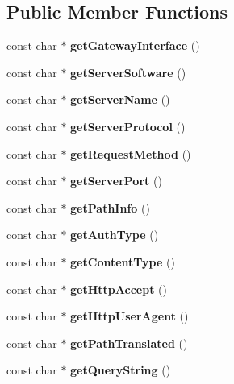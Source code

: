 \subsection*{Public Member Functions}
\begin{CompactItemize}
\item 
const char $\ast$ \textbf{getGatewayInterface} ()\label{classRawRequest_611f7e574e9327a4b28e8eaa2b0768da}

\item 
const char $\ast$ \textbf{getServerSoftware} ()\label{classRawRequest_0fe73e3bf7f06c826f1ce0559acab613}

\item 
const char $\ast$ \textbf{getServerName} ()\label{classRawRequest_e52072dc0f3b002d789307baf7d5b5de}

\item 
const char $\ast$ \textbf{getServerProtocol} ()\label{classRawRequest_84419c69c2ba9f098ace6b3a7adf3bf7}

\item 
const char $\ast$ \textbf{getRequestMethod} ()\label{classRawRequest_d3b574a09ab3b6c1ae11ccf31400d2cd}

\item 
const char $\ast$ \textbf{getServerPort} ()\label{classRawRequest_2749bff43870643ed3dd0ede00a5193f}

\item 
const char $\ast$ \textbf{getPathInfo} ()\label{classRawRequest_747a33e22cdbed6cee706dbf6f7428c5}

\item 
const char $\ast$ \textbf{getAuthType} ()\label{classRawRequest_a1ff10d2be5d983ffc02e55a62399512}

\item 
const char $\ast$ \textbf{getContentType} ()\label{classRawRequest_f0e2412413f43d0f400c1b72911bcf37}

\item 
const char $\ast$ \textbf{getHttpAccept} ()\label{classRawRequest_f49d8635875c59424a289f92a3d75086}

\item 
const char $\ast$ \textbf{getHttpUserAgent} ()\label{classRawRequest_5656142f10afd281f484b65daf5a56f5}

\item 
const char $\ast$ \textbf{getPathTranslated} ()\label{classRawRequest_ad970a1212174aeccfc461aba3a2b245}

\item 
const char $\ast$ \textbf{getQueryString} ()\label{classRawRequest_ada8af8d0f00a35a55f8c30633b96af1}


\end{CompactItemize}
